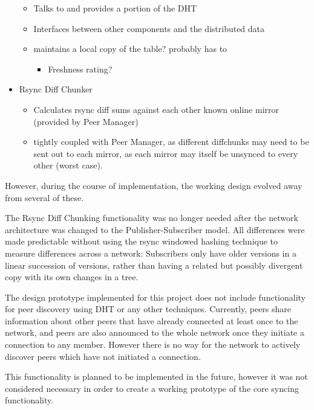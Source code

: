 \documentclass[12pt,a4paper,]{adreport}
\begin{document}
\begin{itemize}
  \begin{itemize}
  \itemsep1pt\parskip0pt
  \item
    Talks to and provides a portion of the DHT
  \item
    Interfaces between other components and the distributed data
  \item
    maintains a local copy of the table? probably has to

    \begin{itemize}
    \itemsep1pt\parskip0pt
    \item
      Freshness rating?
    \end{itemize}
  \end{itemize}
\item
  Rsync Diff Chunker

  \begin{itemize}
  \itemsep1pt\parskip0pt
  \item
    Calculates rsync diff sums against each other known online mirror
    (provided by Peer Manager)
  \item
    tightly coupled with Peer Manager, as different diffchunks may need
    to be sent out to each mirror, as each mirror may itself be unsynced
    to every other (worst case).
  \end{itemize}
\end{itemize}

However, during the course of implementation, the working design evolved
away from several of these.

The Rsync Diff Chunking functionality was no longer needed after the
network architecture was changed to the Publisher-Subscriber model. All
differences were made predictable without using the rsync windowed
hashing technique to measure differences across a network: Subscribers
only have older versions in a linear succession of versions, rather than
having a related but possibly divergent copy with its own changes in a
tree.

The design prototype implemented for this project does not include
functionality for peer discovery using DHT or any other techniques.
Currently, peers share information about other peers that have already
connected at least once to the network, and peers are also announced to
the whole network once they initiate a connection to any member. However
there is no way for the network to actively discover peers which have
not initiated a connection.

This functionality is planned to be implemented in the future, however
it was not considered necessary in order to create a working prototype
of the core syncing functionality.
\end{document}
